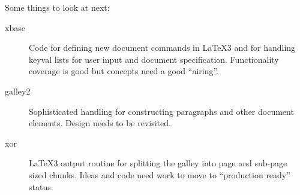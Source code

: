 \documentclass{ltnews}
\begin{document}
Some things to look at next:
\begin{description}
\item [xbase] Code for defining new document commands in \LaTeX3 and for
  handling keyval lists for user input and document specification. 
  Functionality coverage is good but concepts need a good ``airing''.
\item [galley2] Sophisticated handling for constructing paragraphs and
  other document elements. Design needs to be revisited.
\item [xor] \LaTeX3 output routine for splitting the galley into 
  page and sub-page sized chunks. Ideas and code need work to move to
  ``production ready'' status.
\end{description}
\end{document}
